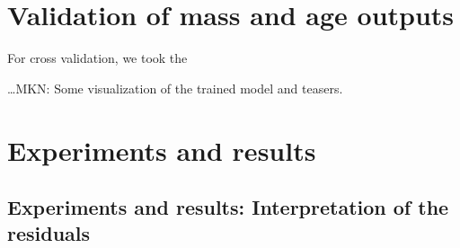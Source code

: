 \documentclass[12pt, preprint]{aastex}
\newcommand{\teff}{\mbox{$\rm T_{eff}$}}
\newcommand{\feh}{\mbox{$\rm [Fe/H]$}}
\newcommand{\logg}{\mbox{$\rm \log g$}}
\begin{document}
\section{Validation of mass and age outputs}

For cross validation, we took the 




\ldots MKN: Some visualization of the trained model and teasers.

\section{Experiments and results}

\subsection{Experiments and results: Interpretation of the residuals}

\end{document}
